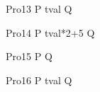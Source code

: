 \begin{circus}
    \circprocess Pro13 \circdef P \circtimedinterrupt \lcirctime tval \rcirctime Q\\
\end{circus}        

\begin{circus}
   \circprocess Pro14 \circdef P \circtimedinterrupt \lcirctime tval*2+5 \rcirctime Q\\
\end{circus}        

\begin{circus}
    \circprocess Pro15 \circdef P \circtimedinterrupt {}  \rcirctime Q\\
\end{circus}        

\begin{circus}
    \circprocess Pro16 \circdef P \circtimedinterrupt {} \upto tval \rcirctime  Q\\
\end{circus} 







